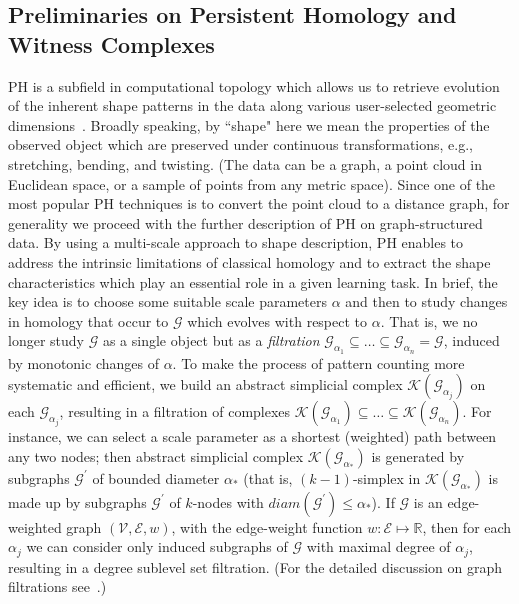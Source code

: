 \documentclass[letterpaper]{article} %
\begin{document}
\subsection{Preliminaries on Persistent Homology and Witness Complexes}
PH is a subfield in computational topology which allows us to retrieve evolution of the inherent shape patterns in the data along various user-selected geometric dimensions~\cite{edelsbrunner2000topological,zomorodian2005computing}. Broadly speaking, by ``shape" here we mean the 
properties of the observed object which are preserved under continuous transformations, e.g., stretching, bending, and twisting. (The data can be a graph, a point cloud in Euclidean space, or a sample of points from any metric space). Since one of the most popular PH techniques is to convert the point cloud to a distance graph, for generality we proceed with the further description of PH on graph-structured data. By using a multi-scale approach to shape description, PH enables to address the intrinsic limitations of classical homology and to extract the shape characteristics which play an essential role in a given learning task. In brief, the key idea is to choose some suitable 
scale parameters $\alpha$ and then to study changes in homology that occur to $\mathcal{G}$ which evolves with respect to $\alpha$. 
That is, we no longer study $\mathcal{G}$ as a single object but as a {\it filtration} $\mathcal{G}_{\alpha_1} \subseteq \ldots \subseteq \mathcal{G}_{\alpha_n}=\mathcal{G}$, induced by monotonic changes of $\alpha$. To make the process of pattern counting more systematic and efficient, we build an abstract simplicial complex $\mathscr{K}(\mathcal{G}_{\alpha_j})$ on each $\mathcal{G}_{\alpha_j}$, resulting in a filtration of complexes $\mathscr{K}(\mathcal{G}_{\alpha_1}) \subseteq \ldots \subseteq \mathscr{K}(\mathcal{G}_{\alpha_n})$.
For instance, we can select a scale parameter as 
a shortest (weighted) path between any two nodes; then
abstract simplicial complex $\mathscr{K}(\mathcal{G}_{\alpha_{*}})$ is generated by subgraphs $\mathcal{G}^{'}$ of bounded diameter $\alpha_{*}$ (that is, $(k-1)$-simplex in $\mathscr{K}(\mathcal{G}_{\alpha_{*}})$ is made up by subgraphs $\mathcal{G}^{'}$ of  $k$-nodes with  $diam(\mathcal{G}^{'})\leq \alpha_{*}$).
If $\mathcal{G}$ is an edge-weighted graph $(\mathcal{V}, \mathcal{E}, w)$, with the edge-weight function $w: \mathcal{E} \mapsto \mathbb{R}$, then 
for each $\alpha_j$ we can consider only induced subgraphs of $\mathcal{G}$ with maximal degree of $\alpha_j$, resulting in a degree sublevel set filtration.
(For the detailed discussion on graph filtrations see~\citet{hofer2020graph}.) 
\end{document}
